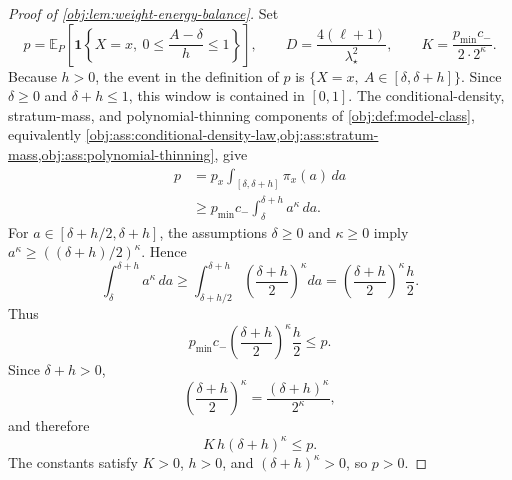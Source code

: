 \begin{proof}[Proof of \cref{obj:lem:weight-energy-balance}]
Set
\[
        p=\mathbb E_P\!\left[
        \mathbf 1\!\left\{X=x,\ 0\le\frac{A-\delta}{h}\le1\right\}\right],
        \qquad
        D=\frac{4(\ell+1)}{\lambda_\star^2},
        \qquad
        K=\frac{p_{\min}c_-}{2\cdot 2^\kappa}.
\]
Because \(h>0\), the event in the definition of \(p\) is
\(\{X=x,\ A\in[\delta,\delta+h]\}\).  Since
\(\delta\ge0\) and \(\delta+h\le1\), this window is contained in
\([0,1]\).  The conditional-density, stratum-mass, and polynomial-thinning
components of \cref{obj:def:model-class}, equivalently
\cref{obj:ass:conditional-density-law,obj:ass:stratum-mass,obj:ass:polynomial-thinning}, give
\[
\begin{aligned}
        p
        &=p_x\int_{[\delta,\delta+h]}\pi_x(a)\,da \\
        &\ge p_{\min}c_-\int_{\delta}^{\delta+h}a^\kappa\,da .
\end{aligned}
\]
For \(a\in[\delta+h/2,\delta+h]\), the assumptions
\(\delta\ge0\) and \(\kappa\ge0\) imply
\(a^\kappa\ge((\delta+h)/2)^\kappa\).  Hence
\[
        \int_{\delta}^{\delta+h}a^\kappa\,da
        \ge
        \int_{\delta+h/2}^{\delta+h}
        \left(\frac{\delta+h}{2}\right)^\kappa da
        =
        \left(\frac{\delta+h}{2}\right)^\kappa\frac h2 .
\]
Thus
\[
        p_{\min}c_-\left(\frac{\delta+h}{2}\right)^\kappa\frac{h}{2}
        \le p .
\]
Since \(\delta+h>0\),
\[
        \left(\frac{\delta+h}{2}\right)^\kappa
        =
        \frac{(\delta+h)^\kappa}{2^\kappa},
\]
and therefore
\[
        K\,h(\delta+h)^\kappa\le p .
\]
The constants satisfy \(K>0\), \(h>0\), and \((\delta+h)^\kappa>0\), so \(p>0\).


\end{proof}
